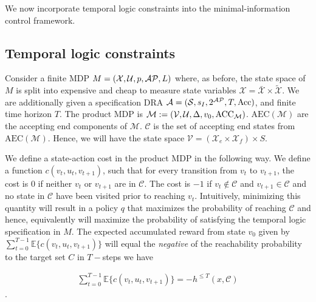 We now incorporate temporal logic constraints into the minimal-information control framework.
\subsection{Temporal logic constraints}
Consider a finite MDP $M=(\mathcal{X},\mathcal{U},p,\mathcal{AP},L)$ where, as before, the state space of $M$ is split into expensive and cheap to measure state variables $\mathcal{X} = \mathcal{\bar{X}} \times \mathcal{\tilde{X}}$. We are additionally given a specification DRA $\mathcal{A} = (\mathcal{S},s_I,2^{\mathcal{AP}}, T,\textrm{Acc})$, and finite time horizon $T$. The product MDP is $\mathcal{M}:= (\mathcal{V},\mathcal{U}, \Delta,v_0,\textrm{ACC}_{\mathcal{M}})$. $\textrm{AEC}(\mathcal{M})$ are the accepting end components of $\mathcal{M}$. $\mathcal{C}$ is the set of accepting end states from $\textrm{AEC}(\mathcal{M})$.  Hence, we will have the state space $\mathcal{V} = (\mathcal{X}_e \times \mathcal{X}_f) \times S$. 

We define a state-action cost in the product MDP in the following way. We define a function $c(v_t,u_t,v_{t+1})$, such that for every transition from $v_t$ to $v_{t+1}$, the cost is $0$ if neither $v_t$ or $v_{t+1}$ are in $\mathcal{C}$. The cost is $-1$ if $v_t \notin \mathcal{C}$ and $v_{t+1} \in \mathcal{C}$ and no state in $\mathcal{C}$ have been visited prior to reaching $v_t$.  Intuitively, minimizing this quantity will result in a policy $q$ that maximizes the probability of reaching $\mathcal{C}$ and hence, equivalently will maximize the probability of satisfying the temporal logic specification in $M$. The expected accumulated reward from state $v_0$ given by $\sum_{t=0}^{T-1}\mathbb{E}\{c(v_t,u_t,v_{t+1})\}$ will equal the \emph{negative} of the reachability probability to the target set $C$ in $T-$steps \ie we have

\begin{align*}
\sum_{t=0}^{T-1}\mathbb{E}\{c(v_t,u_t,v_{t+1})\} = -h^{\leq T}(x,\mathcal{C})
\end{align*}.


